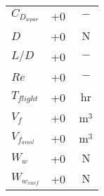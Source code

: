 {\begin{longtable}{llc}
$C_{D_{wpar}}$ & +0  & $~\mathrm{-}$ \\
$D$ & +0  & $~\mathrm{N}$ \\
$L/D$ & +0  & $~\mathrm{-}$ \\
$Re$ & +0  & $~\mathrm{-}$ \\
$T_{flight}$ & +0  & $~\mathrm{hr}$ \\
$V_f$ & +0  & $~\mathrm{m^{3}}$ \\
$V_{f_{avail}}$ & +0  & $~\mathrm{m^{3}}$ \\
$W_w$ & +0  & $~\mathrm{N}$ \\
$W_{w_{surf}}$ & +0  & $~\mathrm{N}$ \\
\bottomrule
\end{longtable}}

% 
